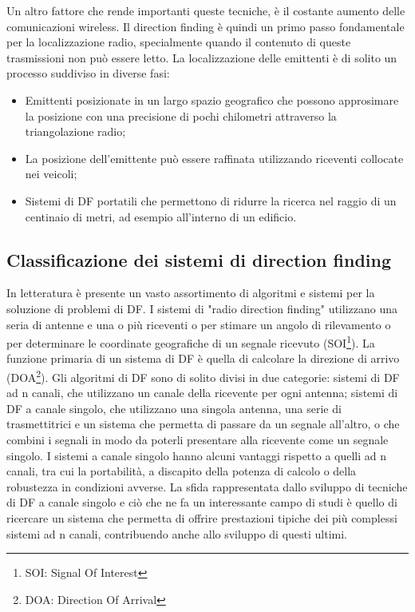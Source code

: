 Un altro fattore che rende importanti queste tecniche, è il costante aumento delle comunicazioni wireless. Il direction finding è quindi un primo passo fondamentale per la localizzazione radio, specialmente quando il contenuto di queste trasmissioni non può essere letto. La localizzazione delle emittenti è di solito un processo suddiviso in diverse fasi: 
\begin{itemize}
\item Emittenti posizionate in un largo spazio geografico che possono approsimare la posizione con una precisione di pochi chilometri attraverso la triangolazione radio;
\item La posizione dell'emittente può essere raffinata utilizzando riceventi collocate nei veicoli; 
\item Sistemi di DF portatili che permettono di ridurre la ricerca nel raggio di un centinaio di metri, ad esempio all'interno di un edificio.
\end{itemize}


\subsection{Classificazione dei sistemi di direction finding}

In letteratura è presente un vasto assortimento di algoritmi e sistemi per la soluzione di problemi di DF.
I sistemi di "radio direction finding" utilizzano una seria di antenne e una o più riceventi o per stimare un angolo di rilevamento o per determinare le coordinate geografiche di un segnale ricevuto (SOI\footnote{SOI: Signal Of Interest}). La funzione primaria di un sistema di DF è quella di calcolare la direzione di arrivo (DOA\footnote{DOA: Direction Of Arrival}). 
Gli algoritmi di DF sono di solito divisi in due categorie: sistemi di DF ad n canali, che utilizzano un canale della ricevente per ogni antenna; sistemi di DF a canale singolo, che utilizzano una singola antenna, una serie di trasmettitrici e un sistema che permetta di passare da un segnale all'altro, o che combini i segnali in modo da poterli presentare alla ricevente come un segnale singolo. I sistemi a canale singolo hanno alcuni vantaggi rispetto a quelli ad n canali, tra cui la portabilità, a discapito della potenza di calcolo o della robustezza in condizioni avverse. La sfida rappresentata dallo sviluppo di tecniche di DF a canale singolo e ciò che ne fa un interessante campo di studi è quello di ricercare un sistema che permetta di offrire prestazioni tipiche dei più complessi sistemi ad n canali, contribuendo anche allo sviluppo di questi ultimi.

